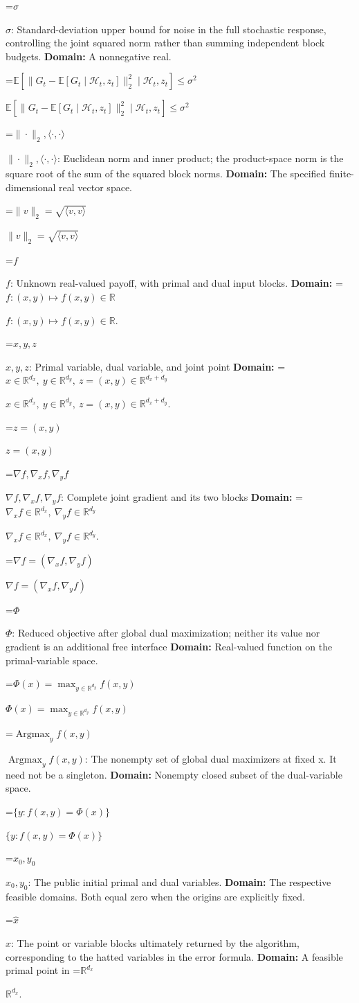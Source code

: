 \documentclass[10pt,a4paper]{article}
\newcommand{\AtlasMath}[1]{\par\begingroup\centering\setbox0=\hbox{$\displaystyle #1$}\ifdim\wd0>1.4\linewidth\typeout{ATLAS WIDE FORMULA: \the\wd0}\fi\ifdim\wd0>\linewidth\resizebox{\linewidth}{!}{\box0}\else\box0\fi\par\endgroup}
\newcommand{\AtlasInlineMath}[1]{\begingroup\setbox0=\hbox{$#1$}\ifdim\wd0>.4\linewidth\endgroup\AtlasMath{#1}\else\endgroup$#1$\fi}
\begin{document}
\AtlasInlineMath{\sigma}: Standard-deviation upper bound for noise in the full stochastic response, controlling the joint squared norm rather than summing independent block budgets. \textbf{Domain:} A nonnegative real.

\AtlasInlineMath{\mathbb E[\|G_t-\mathbb E[G_t\mid\mathcal H_t,z_t]\|_2^2\mid\mathcal H_t,z_t]\le\sigma^2}

\AtlasInlineMath{\|\cdot\|_2,\langle\cdot,\cdot\rangle}: Euclidean norm and inner product; the product-space norm is the square root of the sum of the squared block norms. \textbf{Domain:} The specified finite-dimensional real vector space.

\AtlasInlineMath{\|v\|_2=\sqrt{\langle v,v\rangle}}

\AtlasInlineMath{f}: Unknown real-valued payoff, with primal and dual input blocks. \textbf{Domain:} \AtlasInlineMath{f:(x,y)\mapsto f(x,y)\in\mathbb R}.

\AtlasInlineMath{x,y,z}: Primal variable, dual variable, and joint point \textbf{Domain:} \AtlasInlineMath{x\in\mathbb R^{d_x},\ y\in\mathbb R^{d_y},\ z=(x,y)\in\mathbb R^{d_x+d_y}}.

\AtlasInlineMath{z=(x,y)}

\AtlasInlineMath{\nabla f,\nabla_x f,\nabla_y f}: Complete joint gradient and its two blocks \textbf{Domain:} \AtlasInlineMath{\nabla_x f\in\mathbb R^{d_x},\ \nabla_y f\in\mathbb R^{d_y}}.

\AtlasInlineMath{\nabla f=(\nabla_x f,\nabla_y f)}

\AtlasInlineMath{\Phi}: Reduced objective after global dual maximization; neither its value nor gradient is an additional free interface \textbf{Domain:} Real-valued function on the primal-variable space.

\AtlasInlineMath{\Phi(x)=\max_{y\in \mathbb R^{d_y}}f(x,y)}

\AtlasInlineMath{\operatorname{Argmax}_y f(x,y)}: The nonempty set of global dual maximizers at fixed x. It need not be a singleton. \textbf{Domain:} Nonempty closed subset of the dual-variable space.

\AtlasInlineMath{\{y:f(x,y)=\Phi(x)\}}

\AtlasInlineMath{x_0,y_0}: The public initial primal and dual variables. \textbf{Domain:} The respective feasible domains. Both equal zero when the origins are explicitly fixed.

\AtlasInlineMath{\widehat x}: The point or variable blocks ultimately returned by the algorithm, corresponding to the hatted variables in the error formula. \textbf{Domain:} A feasible primal point in \AtlasInlineMath{\mathbb R^{d_x}}.
\end{document}
